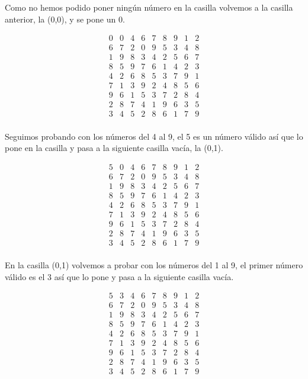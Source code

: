 \documentclass[11pt, a4paper]{article}
\theoremstyle{theorem-style}
\theoremstyle{definition-style}
\theoremstyle{remark-style}
\theoremstyle{example-style}
\begin{document}
Como no hemos podido poner ningún número en la casilla volvemos a la casilla anterior, la (0,0), y se pone un 0.

\[
\begin{array}{ccccccccc}
0 & 0 & 4 & 6 & 7 & 8 & 9 & 1 & 2\\
6 & 7 & 2 & 0 & 9 & 5 & 3 & 4 & 8\\
1 & 9 & 8 & 3 & 4 & 2 & 5 & 6 & 7\\
8 & 5 & 9 & 7 & 6 & 1 & 4 & 2 & 3\\
4 & 2 & 6 & 8 & 5 & 3 & 7 & 9 & 1\\
7 & 1 & 3 & 9 & 2 & 4 & 8 & 5 & 6\\
9 & 6 & 1 & 5 & 3 & 7 & 2 & 8 & 4\\
2 & 8 & 7 & 4 & 1 & 9 & 6 & 3 & 5\\
3 & 4 & 5 & 2 & 8 & 6 & 1 & 7 & 9\\
\end{array}
\]

Seguimos probando con los números del 4 al 9, el 5 es un número válido así que lo pone en la casilla y pasa a la siguiente casilla vacía, la (0,1).

\[
\begin{array}{ccccccccc}
5 & 0 & 4 & 6 & 7 & 8 & 9 & 1 & 2\\
6 & 7 & 2 & 0 & 9 & 5 & 3 & 4 & 8\\
1 & 9 & 8 & 3 & 4 & 2 & 5 & 6 & 7\\
8 & 5 & 9 & 7 & 6 & 1 & 4 & 2 & 3\\
4 & 2 & 6 & 8 & 5 & 3 & 7 & 9 & 1\\
7 & 1 & 3 & 9 & 2 & 4 & 8 & 5 & 6\\
9 & 6 & 1 & 5 & 3 & 7 & 2 & 8 & 4\\
2 & 8 & 7 & 4 & 1 & 9 & 6 & 3 & 5\\
3 & 4 & 5 & 2 & 8 & 6 & 1 & 7 & 9\\
\end{array}
\]
 
En la casilla (0,1) volvemos a probar con los números del 1 al 9, el primer número válido es el 3 así que lo pone y pasa a la siguiente casilla vacía.

\[
\begin{array}{ccccccccc}
5 & 3 & 4 & 6 & 7 & 8 & 9 & 1 & 2\\
6 & 7 & 2 & 0 & 9 & 5 & 3 & 4 & 8\\
1 & 9 & 8 & 3 & 4 & 2 & 5 & 6 & 7\\
8 & 5 & 9 & 7 & 6 & 1 & 4 & 2 & 3\\
4 & 2 & 6 & 8 & 5 & 3 & 7 & 9 & 1\\
7 & 1 & 3 & 9 & 2 & 4 & 8 & 5 & 6\\
9 & 6 & 1 & 5 & 3 & 7 & 2 & 8 & 4\\
2 & 8 & 7 & 4 & 1 & 9 & 6 & 3 & 5\\
3 & 4 & 5 & 2 & 8 & 6 & 1 & 7 & 9\\
\end{array}
\]
\end{document}
